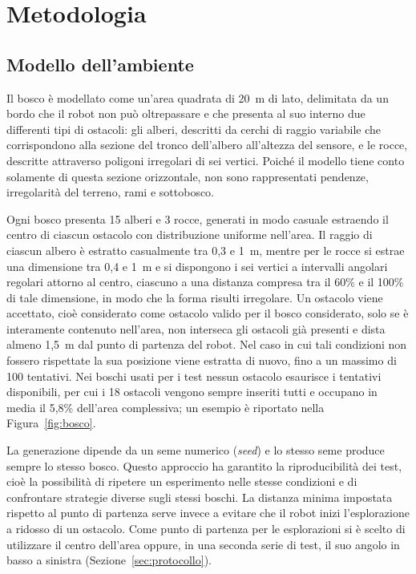 \chapter{Metodologia}
\label{cap:metodologia}

\section{Modello dell'ambiente}
\label{sec:ambiente}

Il bosco è modellato come un'area quadrata di 20~m di lato, delimitata da un bordo che il robot non può oltrepassare e che presenta al suo interno due differenti tipi di ostacoli: gli alberi, descritti da cerchi di raggio variabile che corrispondono alla sezione del tronco dell'albero all'altezza del sensore, e le rocce, descritte attraverso poligoni irregolari di sei vertici. Poiché il modello tiene conto solamente di questa sezione orizzontale, non sono rappresentati pendenze, irregolarità del terreno, rami e sottobosco.

Ogni bosco presenta 15 alberi e 3 rocce, generati in modo casuale estraendo il centro di ciascun ostacolo con distribuzione uniforme nell'area. Il raggio di ciascun albero è estratto casualmente tra 0,3 e 1~m, mentre per le rocce si estrae una dimensione tra 0,4 e 1~m e si dispongono i sei vertici a intervalli angolari regolari attorno al centro, ciascuno a una distanza compresa tra il 60\% e il 100\% di tale dimensione, in modo che la forma risulti irregolare. Un ostacolo viene accettato, cioè considerato come ostacolo valido per il bosco considerato, solo se è interamente contenuto nell'area, non interseca gli ostacoli già presenti e dista almeno 1,5~m dal punto di partenza del robot. Nel caso in cui tali condizioni non fossero rispettate la sua posizione viene estratta di nuovo, fino a un massimo di 100 tentativi. Nei boschi usati per i test nessun ostacolo esaurisce i tentativi disponibili, per cui i 18 ostacoli vengono sempre inseriti tutti e occupano in media il 5,8\% dell'area complessiva; un esempio è riportato nella Figura~\ref{fig:bosco}.

La generazione dipende da un seme numerico (\textit{seed}) e lo stesso seme produce sempre lo stesso bosco. Questo approccio ha garantito la riproducibilità dei test, cioè la possibilità di ripetere un esperimento nelle stesse condizioni e di confrontare strategie diverse sugli stessi boschi. La distanza minima impostata rispetto al punto di partenza serve invece a evitare che il robot inizi l'esplorazione a ridosso di un ostacolo. Come punto di partenza per le esplorazioni si è scelto di utilizzare il centro dell'area oppure, in una seconda serie di test, il suo angolo in basso a sinistra (Sezione~\ref{sec:protocollo}).

